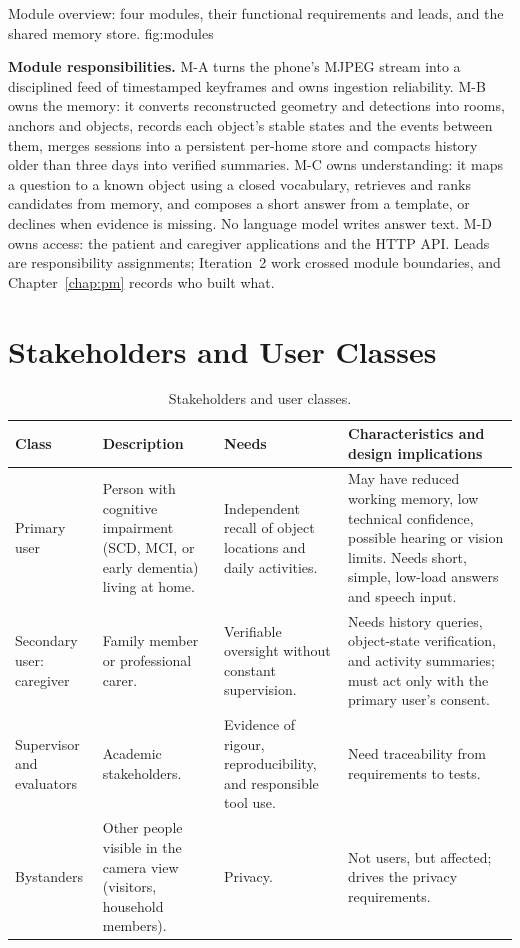   {Module overview: four modules, their functional requirements and leads,
   and the shared memory store. }
  {fig:modules}

\textbf{Module responsibilities.} M-A turns the phone's MJPEG stream into a
disciplined feed of timestamped keyframes and owns ingestion reliability. M-B
owns the memory: it converts reconstructed geometry and detections into rooms,
anchors and objects, records each object's stable states and the events between
them, merges sessions into a persistent per-home store and compacts history
older than three days into verified summaries. M-C owns understanding: it maps
a question to a known object using a closed vocabulary, retrieves and ranks
candidates from memory, and composes a short answer from a template, or
declines when evidence is missing. No language model writes answer text. M-D
owns access: the patient and caregiver applications and the HTTP API. Leads are
responsibility assignments; Iteration~2 work crossed module boundaries, and
Chapter~\ref{chap:pm} records who built what.

\section{Stakeholders and User Classes}
\begin{table}[H]
\centering\footnotesize
\caption{Stakeholders and user classes.}
\label{tab:stakeholders}
\begin{tabularx}{\textwidth}{@{}L{2.2cm} Y Y Y@{}}
\toprule
{}\textbf{Class} & \textbf{Description} & \textbf{Needs} &
\textbf{Characteristics and design implications}\\
\midrule
Primary user & Person with cognitive impairment (SCD, MCI, or early dementia)
living at home. & Independent recall of object locations and daily activities. &
May have reduced working memory, low technical confidence, possible hearing or
vision limits. Needs short, simple, low-load answers and speech input.\\
Secondary user: caregiver & Family member or professional carer. & Verifiable
oversight without constant supervision. & Needs history queries, object-state
verification, and activity summaries; must act only with the primary user's
consent.\\
Supervisor and evaluators & Academic stakeholders. & Evidence of rigour,
reproducibility, and responsible tool use. & Need traceability from
requirements to tests.\\
Bystanders & Other people visible in the camera view (visitors, household
members). & Privacy. & Not users, but affected; drives the privacy
requirements.\\
\bottomrule
\end{tabularx}
\end{table}

